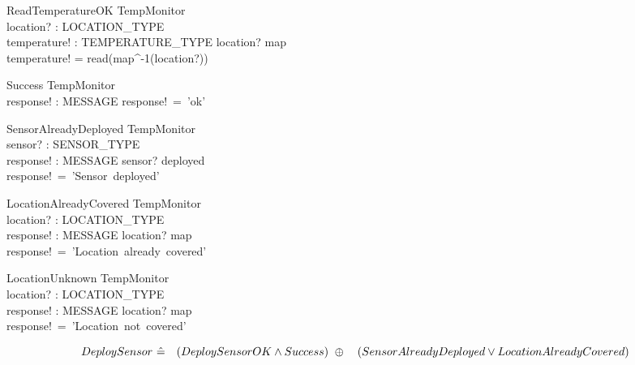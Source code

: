 \documentclass[12pt]{article}
\begin{document}
		
		\begin{schema}{ReadTemperatureOK}
			\Xi TempMonitor\\
			location? : LOCATION\_TYPE\\
			temperature! : TEMPERATURE\_TYPE
			\where
			location? \in \ran map\\
			temperature! = read(map^{-1}(location?))\\
		\end{schema}
		
		
	
		\begin{schema}{Success}
			\Xi TempMonitor\\
			response! : MESSAGE
			\where
			response!~=~'ok'\\
		\end{schema}
		
		
		
		\begin{schema}{SensorAlreadyDeployed}
			\Xi TempMonitor\\
			sensor? : SENSOR\_TYPE\\
			response! : MESSAGE
			\where
			sensor? \in deployed\\
			response!~=~'Sensor~deployed'\\
		\end{schema}
		
		
		
		\begin{schema}{LocationAlreadyCovered}
			\Xi TempMonitor\\
			location? : LOCATION\_TYPE\\
			response! : MESSAGE
			\where
			location? \in \ran map\\
			response!~=~'Location~already~covered'
		\end{schema}
		
		
		
		\begin{schema}{LocationUnknown}
			\Xi TempMonitor\\
			location? : LOCATION\_TYPE\\
			response! : MESSAGE
			\where
			location? \notin \ran map\\
			response!~=~'Location~not~covered'
		\end{schema}
		
		\[ DeploySensor~\hat{=}~\\
		~~~(DeploySensorOK \wedge Success)~ \oplus\\
		~~~(SensorAlreadyDeployed \vee LocationAlreadyCovered) \]
		
\end{document}
